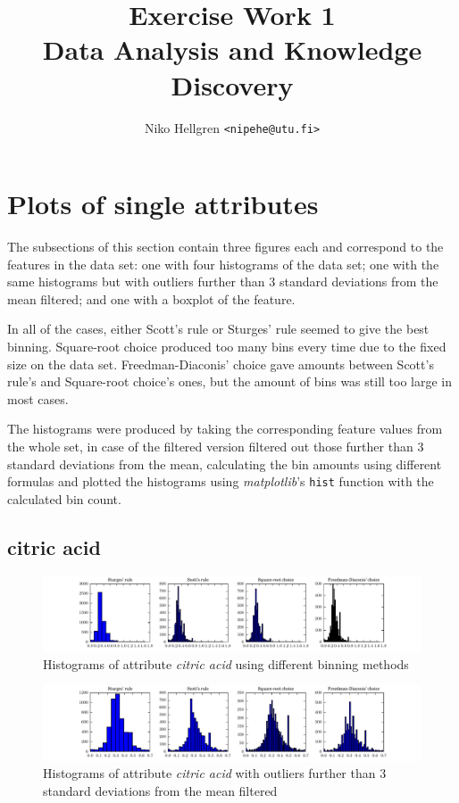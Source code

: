 \documentclass{report}
\author{Niko Hellgren \texttt{<nipehe@utu.fi>}}
\title{Exercise Work 1\\\large Data Analysis and Knowledge Discovery}
\begin{document}
\maketitle
\tableofcontents
\newpage

\section{Plots of single attributes}
The subsections of this section contain three figures each and correspond to the features in the data set: one with four histograms of the data set; one with the same histograms but with outliers further than 3 standard deviations from the mean filtered; and one with a boxplot of the feature.

In all of the cases, either Scott's rule or Sturges' rule seemed to give the best binning. Square-root choice produced too many bins every time due to the fixed size on the data set. Freedman-Diaconis' choice gave amounts between Scott's rule's and Square-root choice's ones, but the amount of bins was still too large in most cases.

The histograms were produced by taking the corresponding feature values from the whole set, in case of the filtered version filtered out those further than 3 standard deviations from the mean, calculating the bin amounts using different formulas and plotted the histograms using \textit{matplotlib}'s \texttt{hist} function with the calculated bin count.
\subsection{citric acid}
\begin{figure}[H]
\includegraphics[width=\textwidth]{histograms/citric_acid.pdf}
\caption{Histograms of attribute \emph{citric acid} using different binning methods}\end{figure}

\begin{figure}[H]
\includegraphics[width=\textwidth]{histograms/citric_acid_filtered.pdf}
\caption{Histograms of attribute \emph{citric acid} with outliers further than 3 standard deviations from the mean filtered}
\end{figure}
\end{document}
